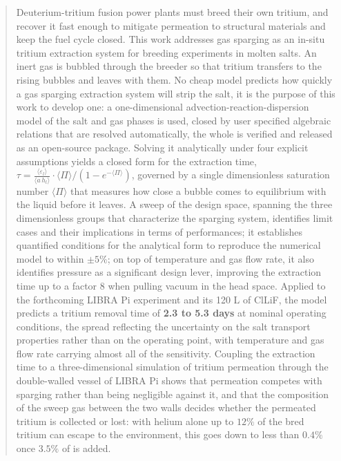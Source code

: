 \documentclass[a4paper,11pt,oneside]{report}
\newcommand{\PI}{\ensuremath{\langle \Pi \rangle}}
\newcounter{assumption}[chapter]
\begin{document}
\begin{abstract}

Deuterium-tritium fusion power plants must breed their own tritium, and recover it fast enough to mitigate permeation to structural materials and keep the fuel cycle closed. 
This work addresses gas sparging as an in-situ tritium extraction system for breeding experiments in molten salts. An inert gas is bubbled through the breeder so that tritium transfers to the rising bubbles and leaves with them. No cheap model predicts how quickly a gas sparging extraction system will strip the salt, it is the purpose of this work to develop one: a one-dimensional advection-reaction-dispersion model of the salt and gas phases is used, closed by user specified algebraic relations that are resolved automatically, the whole is verified and released as an open-source package. Solving it analytically under four explicit assumptions yields a closed form for the extraction time, $\tau=\frac{\langle\varepsilon_l\rangle}{\langle a\,h_l\rangle}\cdot\PI/(1-e^{-\PI})$, governed by a single dimensionless saturation number $\langle\Pi\rangle$ that measures how close a bubble comes to equilibrium with the liquid before it leaves. A sweep of the design space, spanning the three dimensionless groups that characterize the sparging system, identifies limit cases and their implications in terms of performances; it establishes quantified conditions for the analytical form to reproduce the numerical model to within $\pm5\%$; on top of temperature and gas flow rate, it also identifies pressure as a significant design lever, improving the extraction time up to a factor 8 when pulling vacuum in the head space. Applied to the forthcoming LIBRA Pi experiment and its 120 L of ClLiF, the model predicts a tritium removal time of \textbf{2.3 to 5.3 days} at nominal operating conditions, the spread reflecting the uncertainty on the salt transport properties rather than on the operating point, with temperature and gas flow rate carrying almost all of the sensitivity. Coupling the extraction time to a three-dimensional simulation of tritium permeation through the double-walled vessel of LIBRA Pi shows that permeation competes with sparging rather than being negligible against it, and that the composition of the sweep gas between the two walls decides whether the permeated tritium is collected or lost: with helium alone up to $12\%$ of the bred tritium can escape to the environment, this goes down to less than $0.4\%$ once $3.5\%$ of  is added.
\end{abstract}
\end{document}

